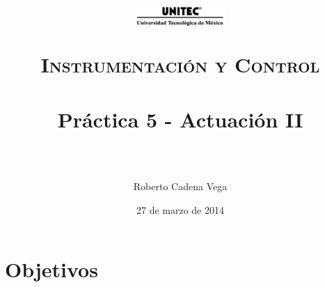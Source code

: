 



\title{	
	\normalfont \normalsize
	\begin{figure}[h]
		\begin{center}
			\includegraphics[width=0.3\textwidth]{../../images/UNITEC.png} %
		\end{center}
	\end{figure}
	\textsc{Instrumentación y Control} \\ [25pt]
	\horrule{0.5pt} \\[0.4cm] %
	\huge Práctica 5 - Actuación II \\ %
	\horrule{2pt} \\[0.5cm] %
}

\author{Roberto Cadena Vega} %

\date{\normalsize 27 de marzo de 2014} %




\maketitle %


\section{Objetivos}

